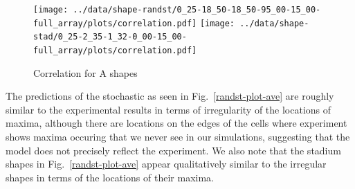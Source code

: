\documentclass[letterpaper,twocolumn,amsmath,amssymb,pre]{revtex4-1}
\newcommand{\red}[1]{{\bf \color{red} #1}}
\newcommand{\fixme}[1]{\red{[#1]}}
\begin{document}

\begin{figure}
  \texttt{[image: ../data/shape-randst/0\_25-18\_50-18\_50-95\_00-15\_00-full\_array/plots/correlation.pdf]}
  \texttt{[image: ../data/shape-stad/0\_25-2\_35-1\_32-0\_00-15\_00-full\_array/plots/correlation.pdf]}
  \caption{Correlation for A shapes}
  \label{fig:corr-pancake-A}
\end{figure}

The predictions of the stochastic as seen in
Fig.~\ref{randst-plot-ave} are roughly similar to the experimental
results in terms of irregularity of the locations of maxima, although
there are locations on the edges of the cells where experiment shows
maxima occuring that we never see in our simulations, suggesting that
the model does not precisely reflect the experiment.  We also note
that the stadium shapes in Fig.~\ref{randst-plot-ave} appear
qualitatively similar to the irregular shapes in terms of the
locations of their maxima.
\end{document}
